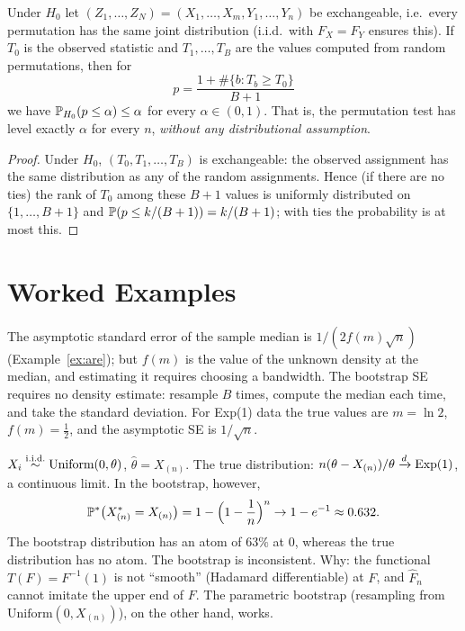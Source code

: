 \documentclass[main.tex]{subfiles}
\begin{document}
\begin{theorem}\label{thm:permutasyon}
Under $H_0$ let $(Z_1,\dots,Z_N)=(X_1,\dots,X_m,Y_1,\dots,Y_n)$ be exchangeable, i.e.\ every permutation has the same joint distribution (i.i.d.\ with $F_X=F_Y$ ensures this). If $T_0$ is the observed statistic and $T_1,\dots,T_B$ are the values computed from random permutations, then for
\[
p=\frac{1+\#\{b:T_b\ge T_0\}}{B+1}
\]
we have $\P_{H_0}(p\le\alpha)\le\alpha$ for every $\alpha\in(0,1)$. That is, the permutation test has level exactly $\alpha$ for every $n$, \emph{without any distributional assumption}.
\end{theorem}
\begin{proof}
Under $H_0$, $(T_0,T_1,\dots,T_B)$ is exchangeable: the observed assignment has the same distribution as any of the random assignments. Hence (if there are no ties) the rank of $T_0$ among these $B+1$ values is uniformly distributed on $\{1,\dots,B+1\}$ and $\P(p\le k/(B+1))=k/(B+1)$; with ties the probability is at most this.
\end{proof}

\section{Worked Examples}

\begin{example}\label{ex:medyan-se}
The asymptotic standard error of the sample median is $1/(2f(m)\sqrt n)$ (Example~\ref{ex:are}); but $f(m)$ is the value of the unknown density at the median, and estimating it requires choosing a bandwidth. The bootstrap SE requires no density estimate: resample $B$ times, compute the median each time, and take the standard deviation. For Exp(1) data the true values are $m=\ln2$, $f(m)=\frac12$, and the asymptotic SE is $1/\sqrt n$.
\end{example}

\begin{example}\label{ex:boot-basarisiz}
$X_i\iid\text{Uniform}(0,\theta)$, $\hat\theta=X_{(n)}$. The true distribution: $n(\theta-X_{(n)})/\theta\dto\text{Exp}(1)$, a continuous limit. In the bootstrap, however,
\[
\P^*\big(X^*_{(n)}=X_{(n)}\big)=1-\Big(1-\frac1n\Big)^n\to1-e^{-1}\approx0.632 .
\]
The bootstrap distribution has an atom of $63\%$ at $0$, whereas the true distribution has no atom. The bootstrap is inconsistent. Why: the functional $T(F)=F^{-1}(1)$ is not ``smooth'' (Hadamard differentiable) at $F$, and $\hat F_n$ cannot imitate the upper end of $F$. The parametric bootstrap (resampling from $\text{Uniform}(0,X_{(n)})$), on the other hand, works.
\end{example}
\end{document}
